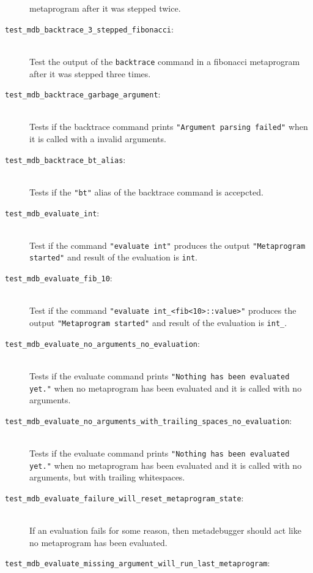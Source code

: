 \begin{description}
        metaprogram after it was stepped twice.
    \item[\texttt{test\_mdb\_backtrace\_3\_stepped\_fibonacci}:] \hfill \\
        Test the output of the \texttt{backtrace} command in a fibonacci
        metaprogram after it was stepped three times.
    \item[\texttt{test\_mdb\_backtrace\_garbage\_argument}:] \hfill \\
        Tests if the backtrace command prints
        \texttt{"Argument parsing failed"} when it is called with a invalid
        arguments.
    \item[\texttt{test\_mdb\_backtrace\_bt\_alias}:] \hfill \\
        Tests if the \texttt{"bt"} alias of the backtrace command is
        accepcted.
    \item[\texttt{test\_mdb\_evaluate\_int}:] \hfill \\
        Test if the command \texttt{"evaluate int"} produces the output
        \texttt{"Metaprogram started"} and result of the evaluation is
        \texttt{int}.
    \item[\texttt{test\_mdb\_evaluate\_fib\_10}:] \hfill \\
        Test if the command \texttt{"evaluate int\_<fib<10>::value>"} produces
        the output \texttt{"Metaprogram started"} and result of the evaluation
        is \texttt{int\_<55>}.
    \item[\texttt{test\_mdb\_evaluate\_no\_arguments\_no\_evaluation}:] \hfill \\
        Tests if the evaluate command prints
        \texttt{"Nothing has been evaluated yet."} when no metaprogram has been
        evaluated and it is called with no arguments.
    \item[\texttt{test\_mdb\_evaluate\_no\_arguments\_with\_trailing\_spaces\_no\_evaluation}:] \hfill \\
        Tests if the evaluate command prints
        \texttt{"Nothing has been evaluated yet."} when no metaprogram has been
        evaluated and it is called with no arguments, but with trailing
        whitespaces.
    \item[\texttt{test\_mdb\_evaluate\_failure\_will\_reset\_metaprogram\_state}:] \hfill \\
        If an evaluation fails for some reason, then metadebugger should act
        like no metaprogram has been evaluated.
    \item[\texttt{test\_mdb\_evaluate\_missing\_argument\_will\_run\_last\_metaprogram}:] \hfill \\

\end{description}
